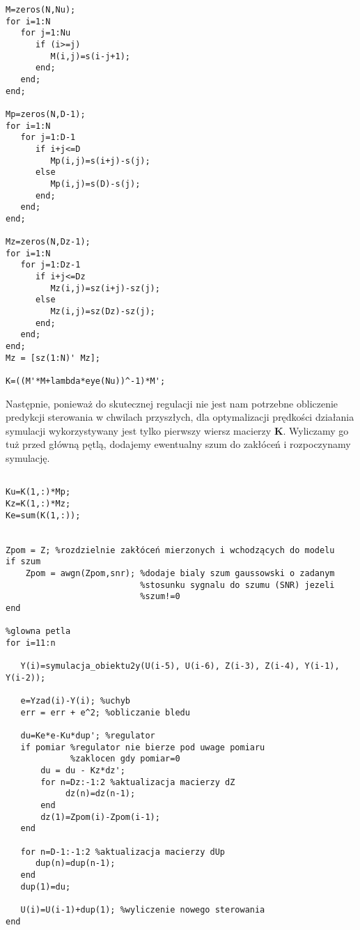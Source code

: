 \begin{lstlisting}[style=Matlab-editor]
%generacja macierzy
M=zeros(N,Nu);
for i=1:N
   for j=1:Nu
      if (i>=j)
         M(i,j)=s(i-j+1);
      end;
   end;
end;

Mp=zeros(N,D-1);
for i=1:N
   for j=1:D-1
      if i+j<=D
         Mp(i,j)=s(i+j)-s(j);
      else
         Mp(i,j)=s(D)-s(j);
      end;
   end;
end;

Mz=zeros(N,Dz-1);
for i=1:N
   for j=1:Dz-1
      if i+j<=Dz
         Mz(i,j)=sz(i+j)-sz(j);
      else
         Mz(i,j)=sz(Dz)-sz(j);
      end;
   end;
end;
Mz = [sz(1:N)' Mz];

K=((M'*M+lambda*eye(Nu))^-1)*M';
\end{lstlisting} 

Następnie, ponieważ do skutecznej regulacji nie jest nam potrzebne obliczenie predykcji sterowania w chwilach przyszłych, dla optymalizacji prędkości działania symulacji wykorzystywany jest tylko pierwszy wiersz macierzy $ \boldsymbol{K} $. Wyliczamy go tuż przed główną pętlą, dodajemy ewentualny szum do zakłóceń i rozpoczynamy symulację.


\begin{lstlisting}[style=Matlab-editor]
%przeksztalcanie wyliczonych macierzy do potrzebnych nam parametrow

Ku=K(1,:)*Mp;
Kz=K(1,:)*Mz;
Ke=sum(K(1,:));


Zpom = Z; %rozdzielnie zakłóceń mierzonych i wchodzących do modelu
if szum
    Zpom = awgn(Zpom,snr); %dodaje bialy szum gaussowski o zadanym
                           %stosunku sygnalu do szumu (SNR) jezeli 
                           %szum!=0
end

%glowna petla
for i=11:n

   Y(i)=symulacja_obiektu2y(U(i-5), U(i-6), Z(i-3), Z(i-4), Y(i-1), Y(i-2));

   e=Yzad(i)-Y(i); %uchyb
   err = err + e^2; %obliczanie bledu

   du=Ke*e-Ku*dup'; %regulator
   if pomiar %regulator nie bierze pod uwage pomiaru 
   			 %zaklocen gdy pomiar=0
       du = du - Kz*dz';
       for n=Dz:-1:2 %aktualizacja macierzy dZ
       		dz(n)=dz(n-1);
       end
       dz(1)=Zpom(i)-Zpom(i-1);
   end

   for n=D-1:-1:2 %aktualizacja macierzy dUp
      dup(n)=dup(n-1);
   end
   dup(1)=du;
   
   U(i)=U(i-1)+dup(1); %wyliczenie nowego sterowania
end
\end{lstlisting}

